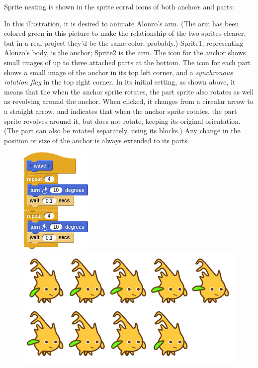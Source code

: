 \documentclass{report}
\begin{document}
Sprite nesting is shown in the sprite corral icons of both anchors and parts:\nopagebreak


In this illustration, it is desired to animate Alonzo's arm. (The arm has been colored green in this picture to make the relationship of the two sprites clearer, but in a real project they'd be the same color, probably.) Sprite1, representing Alonzo's body, is the anchor; Sprite2 is the arm. The icon for the anchor shows small images of up to three attached parts at the bottom. The icon for each part shows a small image of the anchor in its top left corner, and a \emph{synchronous rotation flag} in the top right corner. In its initial setting, as shown above, it means that the when the anchor sprite rotates, the part sprite also rotates as well as revolving around the anchor. When clicked, it changes from a circular arrow to a straight arrow, and indicates that when the anchor sprite rotates, the part sprite revolves around it, but does not rotate, keeping its original orientation. (The part can also be rotated separately, using its  blocks.) Any change in the position or size of the anchor is always extended to its parts.

\begin{figure}[H]
\centering
\includegraphics[scale=\defaultGraphicsScale]{hand-waving-command}%
\hspace{2em}%
\includegraphics[scale=0.4]{../common/alonzo-waving}
\end{figure}
\end{document}
